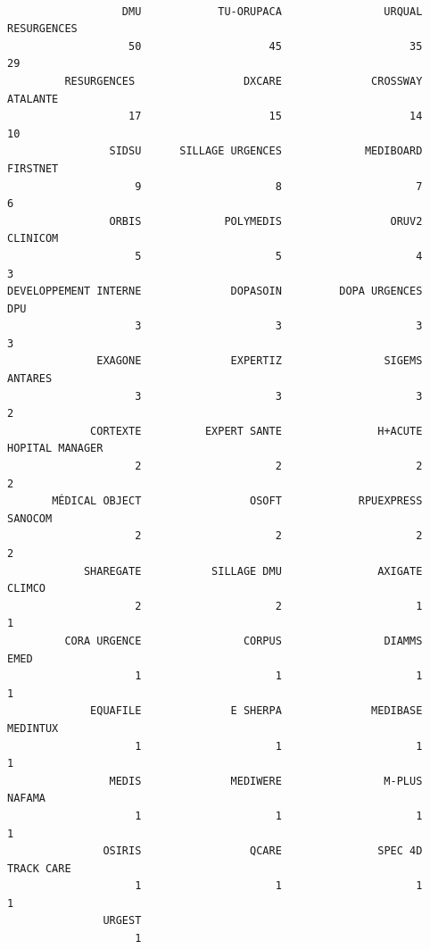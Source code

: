 \documentclass[]{article}
\begin{document}
\begin{verbatim}

                  DMU            TU-ORUPACA                URQUAL           RESURGENCES 
                   50                    45                    35                    29 
         RESURGENCES                 DXCARE              CROSSWAY              ATALANTE 
                   17                    15                    14                    10 
                SIDSU      SILLAGE URGENCES             MEDIBOARD              FIRSTNET 
                    9                     8                     7                     6 
                ORBIS             POLYMEDIS                 ORUV2              CLINICOM 
                    5                     5                     4                     3 
DEVELOPPEMENT INTERNE              DOPASOIN         DOPA URGENCES                   DPU 
                    3                     3                     3                     3 
              EXAGONE              EXPERTIZ                SIGEMS               ANTARES 
                    3                     3                     3                     2 
             CORTEXTE          EXPERT SANTE               H+ACUTE       HOPITAL MANAGER 
                    2                     2                     2                     2 
       MÉDICAL OBJECT                 OSOFT            RPUEXPRESS               SANOCOM 
                    2                     2                     2                     2 
            SHAREGATE           SILLAGE DMU               AXIGATE                CLIMCO 
                    2                     2                     1                     1 
         CORA URGENCE                CORPUS                DIAMMS                  EMED 
                    1                     1                     1                     1 
             EQUAFILE              E SHERPA              MEDIBASE              MEDINTUX 
                    1                     1                     1                     1 
                MEDIS              MEDIWERE                M-PLUS                NAFAMA 
                    1                     1                     1                     1 
               OSIRIS                 QCARE               SPEC 4D            TRACK CARE 
                    1                     1                     1                     1 
               URGEST 
                    1 
\end{verbatim}
\end{document}
